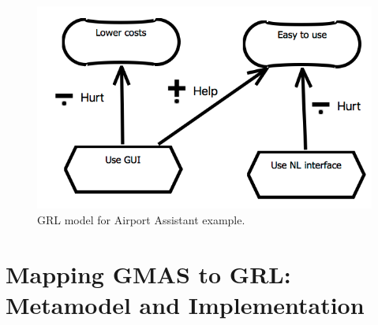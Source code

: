 \documentclass[11.5pt,two column]{llncs}
\begin{document}
\begin{figure}
\centering
\includegraphics[scale=0.35]{img/grl_example_airport}
\caption{GRL model for Airport Assistant example.}
\label{fig:example:airport:grl}
\end{figure}

\section{Mapping GMAS to GRL: Metamodel and Implementation}
\label{sect:implementation}
\end{document}
